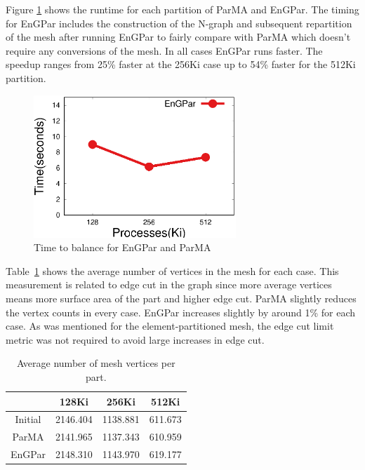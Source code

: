 \documentclass[conference]{IEEEtran}
\begin{document}
Figure \ref{fig:fem_time} shows the runtime for each partition of ParMA and EnGPar. The
timing for EnGPar includes the construction of the N-graph and subsequent repartition of
the mesh after running EnGPar to fairly compare with ParMA which doesn't require any
conversions of the mesh. In all cases EnGPar runs faster. The speedup ranges from
25\% faster at the 256Ki case up to 54\% faster for the 512Ki partition.

\begin{figure}[!ht]
  \centering
  \includegraphics[width=3in]{plots/mira_fem_results/time_v_cores}
  \caption{Time to balance for EnGPar and ParMA}
  \label{fig:fem_time}
\end{figure}

Table~\ref{tbl:avgvtx} shows the average number of vertices in the mesh for each case.
This measurement is related to edge cut in the graph since more average vertices
means more surface area of the part and higher edge cut. ParMA slightly reduces the
vertex counts in every case. EnGPar increases slightly by around 1\% for each case. As was
mentioned for the element-partitioned mesh, the edge cut limit metric was not required to
avoid large increases in edge cut.

\begin{table}[!h]
\centering
\begin{tabular}{||c|c|c|c||}
\hline
&128Ki&256Ki&512Ki \\
\hline
Initial & 2146.404 & 1138.881 & 611.673 \\
ParMA & 2141.965 & 1137.343 & 610.959 \\
EnGPar & 2148.310 &  1143.970 & 619.177 \\
\hline
\end{tabular}
\caption{Average number of mesh vertices per part.}
\label{tbl:avgvtx}
\end{table}
\end{document}
